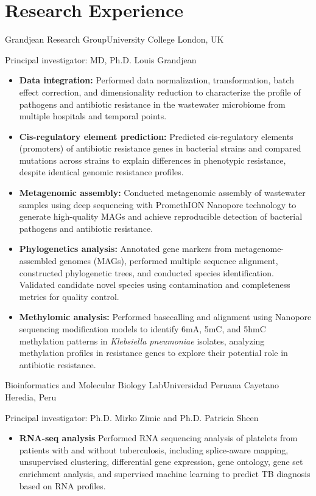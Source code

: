 \documentclass[11pt,a4paper,sans]{moderncv}
\begin{document}
\section{Research Experience}
  {Grandjean Research Group}{University College London, UK}{}
  {Principal investigator: MD, Ph.D. Louis Grandjean
  \begin{itemize}%
    \item \textbf{Data integration:} Performed data normalization, transformation, batch effect correction, and dimensionality reduction to characterize the profile of pathogens and antibiotic resistance in the wastewater microbiome from multiple hospitals and temporal points.    \item \textbf{Cis-regulatory element prediction:} Predicted cis-regulatory elements (promoters) of antibiotic resistance genes in bacterial strains and compared mutations across strains to explain differences in phenotypic resistance, despite identical genomic resistance profiles.
    \item \textbf{Metagenomic assembly:} Conducted metagenomic assembly of wastewater samples using deep sequencing with PromethION Nanopore technology to generate high-quality MAGs and achieve reproducible detection of bacterial pathogens and antibiotic resistance.
    \item \textbf{Phylogenetics analysis:} Annotated gene markers from metagenome-assembled genomes (MAGs), performed multiple sequence alignment, constructed phylogenetic trees, and conducted species identification. Validated candidate novel species using contamination and completeness metrics for quality control.
    \item \textbf{Methylomic analysis:} Performed basecalling and alignment using Nanopore sequencing modification models to identify 6mA, 5mC, and 5hmC methylation patterns in \textit{Klebsiella pneumoniae} isolates, analyzing methylation profiles in resistance genes to explore their potential role in antibiotic resistance.
  \end{itemize}
  }

  {Bioinformatics and Molecular Biology Lab}{Universidad Peruana Cayetano Heredia, Peru}
  {}
  {Principal investigator: Ph.D. Mirko Zimic and  Ph.D. Patricia Sheen%
  \begin{itemize}%
    \item \textbf{RNA-seq analysis} Performed RNA sequencing analysis of platelets from patients with and without tuberculosis, including splice-aware mapping, unsupervised clustering, differential gene expression, gene ontology, gene set enrichment analysis, and supervised machine learning to predict TB diagnosis based on RNA profiles.
  \end{itemize}
  }
\end{document}
